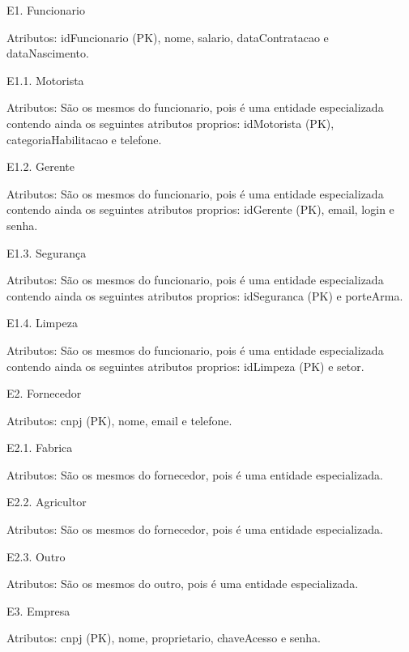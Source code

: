 \documentclass[12pt, onecolumn, titlepage]{article}
\begin{document}
\begin{description}

\item E1. Funcionario
\item \qquad Atributos: idFuncionario (PK), nome, salario, dataContratacao e dataNascimento.

\item E1.1. Motorista
\item \qquad Atributos: São os mesmos do funcionario, pois é uma entidade especializada contendo ainda os seguintes atributos proprios: idMotorista (PK), categoriaHabilitacao e telefone.

\item E1.2. Gerente
\item \qquad Atributos: São os mesmos do funcionario, pois é uma entidade especializada contendo ainda os seguintes atributos proprios: idGerente (PK), email, login e senha.

\item E1.3. Segurança
\item \qquad Atributos: São os mesmos do funcionario, pois é uma entidade especializada contendo ainda os seguintes atributos proprios: idSeguranca (PK) e porteArma.

\item E1.4. Limpeza
\item \qquad Atributos: São os mesmos do funcionario, pois é uma entidade especializada contendo ainda os seguintes atributos proprios: idLimpeza (PK) e setor.

\item E2. Fornecedor
\item \qquad Atributos: cnpj (PK), nome, email e telefone.

\item E2.1. Fabrica
\item \qquad Atributos: São os mesmos do fornecedor, pois é uma entidade especializada.

\item E2.2. Agricultor
\item \qquad Atributos: São os mesmos do fornecedor, pois é uma entidade especializada.

\item E2.3. Outro
\item \qquad Atributos: São os mesmos do outro, pois é uma entidade especializada.

\item E3. Empresa
\item \qquad Atributos: cnpj (PK), nome, proprietario, chaveAcesso e senha.


\end{description}
\end{document}
